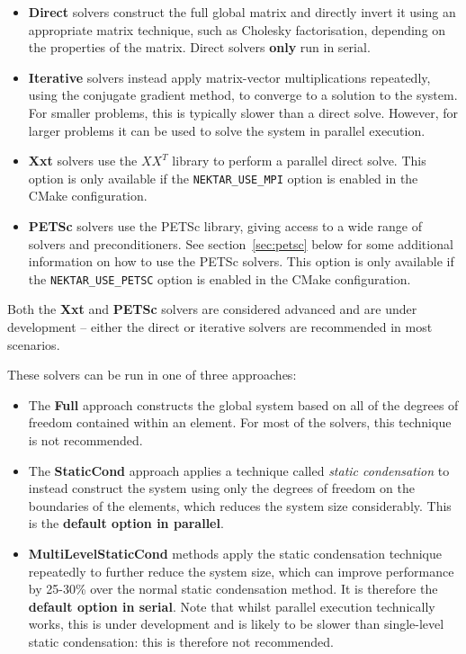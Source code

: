 \begin{itemize}
  \item \textbf{Direct} solvers construct the full global matrix and directly
  invert it using an appropriate matrix technique, such as Cholesky
  factorisation, depending on the properties of the matrix. Direct solvers
  \textbf{only} run in serial.
  \item \textbf{Iterative} solvers instead apply matrix-vector multiplications
  repeatedly, using the conjugate gradient method, to converge to a solution to
  the system. For smaller problems, this is typically slower than a direct
  solve. However, for larger problems it can be used to solve the system in
  parallel execution.
  \item \textbf{Xxt} solvers use the $XX^T$ library to perform a parallel direct
  solve. This option is only available if the \texttt{NEKTAR\_USE\_MPI} option
  is enabled in the CMake configuration.
  \item \textbf{PETSc} solvers use the PETSc library, giving access to a wide
  range of solvers and preconditioners. See section~\ref{sec:petsc} below for
  some additional information on how to use the PETSc solvers. This option is
  only available if the \texttt{NEKTAR\_USE\_PETSC} option is enabled in the
  CMake configuration.
\end{itemize}

\begin{warningbox}
Both the \textbf{Xxt} and \textbf{PETSc} solvers are considered advanced and are
under development -- either the direct or iterative solvers are recommended in
most scenarios.
\end{warningbox}

These solvers can be run in one of three approaches:

\begin{itemize}
  \item The \textbf{Full} approach constructs the global system based on all of
  the degrees of freedom contained within an element. For most of the \nekpp
  solvers, this technique is not recommended.
  \item The \textbf{StaticCond} approach applies a technique called \emph{static
    condensation} to instead construct the system using only the degrees of
  freedom on the boundaries of the elements, which reduces the system size
  considerably. This is the \textbf{default option in parallel}.
  \item \textbf{MultiLevelStaticCond} methods apply the static condensation
  technique repeatedly to further reduce the system size, which can improve
  performance by 25-30\% over the normal static condensation method. It is
  therefore the \textbf{default option in serial}. Note that whilst parallel
  execution technically works, this is under development and is likely to be
  slower than single-level static condensation: this is therefore not
  recommended.
\end{itemize}

